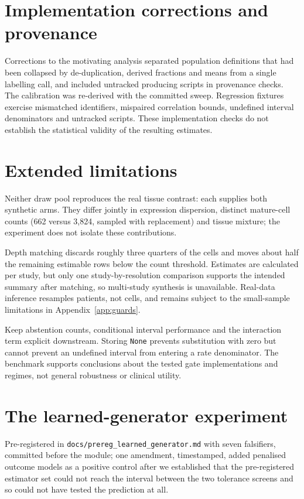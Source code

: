 \section{Implementation corrections and provenance}
\label{app:withdrawn}
Corrections to the motivating analysis separated population definitions that
had been collapsed by de-duplication, derived fractions and means from a single
labelling call, and included untracked producing scripts in provenance checks.
The calibration was re-derived with the committed sweep. Regression fixtures
exercise mismatched identifiers, mispaired correlation bounds, undefined
interval denominators and untracked scripts. These implementation checks do
not establish the statistical validity of the resulting estimates.

\section{Extended limitations}
\label{app:limitations}
Neither draw pool reproduces the real tissue contrast: each supplies both
synthetic arms. They differ jointly in expression dispersion, distinct
mature-cell counts (662 versus 3{,}824, sampled with replacement) and tissue
mixture; the experiment does not isolate these contributions.

Depth matching discards roughly three quarters of the cells and moves about
half the remaining estimable rows below the count threshold. Estimates are
calculated per study, but only one study-by-resolution comparison supports the
intended summary after matching, so multi-study synthesis is unavailable.
Real-data inference resamples patients, not cells, and remains subject to the
small-sample limitations in Appendix~\ref{app:guards}.

Keep abstention counts, conditional interval performance and the interaction
term explicit downstream. Storing \texttt{None} prevents substitution with zero
but cannot prevent an undefined interval from entering a rate denominator.
The benchmark supports conclusions about the tested gate implementations and
regimes, not general robustness or clinical utility.

\section{The learned-generator experiment}
\label{app:learned}

Pre-registered in \texttt{docs/prereg\_learned\_generator.md} with seven
falsifiers, committed before the module; one amendment, timestamped, added
penalised outcome models as a positive control after we established that the
pre-registered estimator set could not reach the interval between the two
tolerance screens and so could not have tested the prediction at all.

